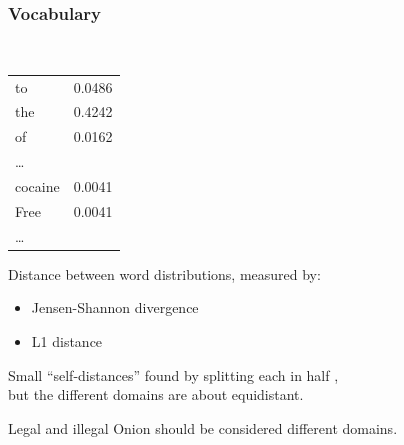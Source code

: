 \documentclass[t,xcolor={svgnames,table}]{beamer}
\begin{document}
\begin{frame}
	\frametitle{Vocabulary}
	
	\begin{flushright}\tt\small
	\begin{tabular}{|lr|}
	\hline
	to & 0.0486 \\
	the & 0.4242 \\
	of & 0.0162 \\
	\ldots & \\
	cocaine & 0.0041 \\
	Free & 0.0041 \\
	\ldots & \\
	\hline
	\end{tabular}
	\end{flushright}
	\vspace{-35mm}
	
	Distance between word distributions\pause, measured by:
	\begin{minipage}{.43\textwidth}
		\begin{itemize}
			\item Jensen-Shannon divergence
		\end{itemize}
	\end{minipage}
	\begin{minipage}{.3\textwidth}
		\begin{itemize}
			\item L1 distance
		\end{itemize}
	\end{minipage}
	\vfill
	
	Small ``self-distances'' found by splitting each in half {\pause}, \\ 
	but the different domains are about equidistant.
	
	\begin{center}
	\end{center}
	\pause
	
	Legal and illegal Onion should be considered different domains.
\end{frame}
\end{document}
